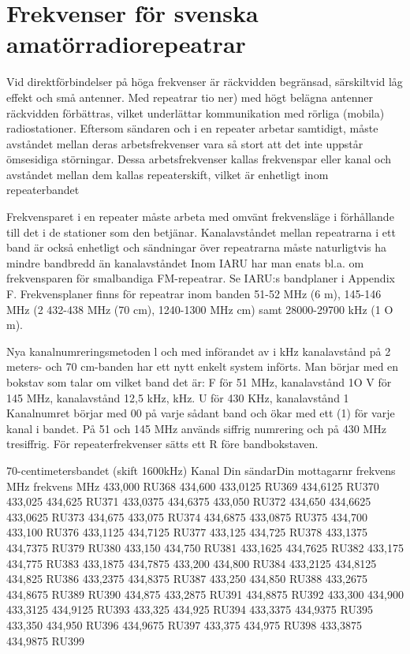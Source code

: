 \chapter{Frekvenser för svenska amatörradiorepeatrar}
Vid direktförbindelser på höga frekvenser är
räckvidden begränsad, särskiltvid låg effekt
och små antenner. Med repeatrar
tio ner) med högt belägna antenner
räckvidden förbättras, vilket underlättar kommunikation med rörliga (mobila) radiostationer.
Eftersom sändaren och
i en
repeater arbetar samtidigt, måste avståndet
mellan deras arbetsfrekvenser vara så stort
att det inte uppstår ömsesidiga störningar.
Dessa arbetsfrekvenser kallas frekvenspar eller kanal och avståndet mellan dem
kallas repeaterskift, vilket är enhetligt inom
repeaterbandet

Frekvensparet i en repeater måste arbeta med omvänt frekvensläge i förhållande
till det i de stationer som den betjänar.
Kanalavståndet mellan repeatrarna i ett
band är också enhetligt och sändningar över
repeatrarna måste naturligtvis ha mindre
bandbredd än kanalavståndet
Inom IARU har man enats bl.a. om frekvensparen för smalbandiga FM-repeatrar.
Se IARU:s bandplaner i Appendix F.
Frekvensplaner finns för repeatrar inom
banden 51-52 MHz (6 m), 145-146 MHz (2
432-438 MHz (70 cm), 1240-1300 MHz
cm) samt 28000-29700 kHz (1 O m).

Nya kanalnumreringsmetoden
l och med införandet av i
kHz kanalavstånd på 2 meters- och 70 cm-banden har
ett nytt enkelt system införts. Man börjar med
en bokstav som talar om vilket band det är:
F för 51 MHz, kanalavstånd 1O
V för 145 MHz, kanalavstånd 12,5 kHz,
kHz.
U för 430 KHz, kanalavstånd 1
Kanalnumret börjar med 00 på varje sådant band och ökar med ett (1) för varje kanal
i bandet. På 51 och 145 MHz används
siffrig numrering och på 430 MHz tresiffrig.
För repeaterfrekvenser sätts ett R före bandbokstaven.

70-centimetersbandet (skift 1600kHz)
Kanal
Din sändarDin mottagarnr
frekvens MHz frekvens MHz
433,000
RU368
434,600
433,0125
RU369
434,6125
RU370
433,025
434,625
RU371
433,0375
434,6375
433,050
RU372
434,650
434,6625
433,0625
RU373
434,675
433,075
RU374
434,6875
433,0875
RU375
434,700
433,100
RU376
433,1125
434,7125
RU377
433,125
434,725
RU378
433,1375
434,7375
RU379
RU380
433,150
434,750
RU381
433,1625
434,7625
RU382
433,175
434,775
RU383
433,1875
434,7875
433,200
434,800
RU384
433,2125
434,8125
434,825
RU386
433,2375
434,8375
RU387
433,250
434,850
RU388
433,2675
434,8675
RU389
RU390
434,875
433,2875
RU391
434,8875
RU392
433,300
434,900
433,3125
434,9125
RU393
433,325
434,925
RU394
433,3375
434,9375
RU395
433,350
434,950
RU396
434,9675
RU397
433,375
434,975
RU398
433,3875
434,9875
RU399

